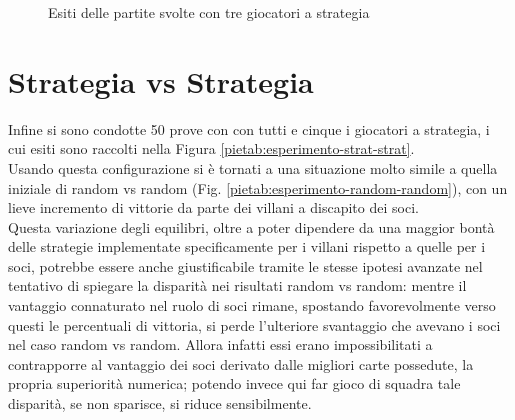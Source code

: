 \begin{figure}[!htb]
\label{piech:ultimo-vill}
\caption{Esiti delle partite svolte con tre giocatori a strategia}
\end{figure}












\section{Strategia vs Strategia}

Infine si sono condotte 50 prove con con tutti e cinque i giocatori a strategia, i cui esiti sono raccolti nella Figura \ref{pietab:esperimento-strat-strat}.\\
Usando questa configurazione si è tornati a una situazione molto simile a quella iniziale di random vs random (Fig. \ref{pietab:esperimento-random-random}), con un lieve incremento di vittorie da parte dei villani a discapito dei soci.\\
Questa variazione degli equilibri, oltre a poter dipendere da una maggior bontà delle strategie implementate specificamente per i villani rispetto a quelle per i soci, potrebbe essere anche giustificabile tramite le stesse ipotesi avanzate nel tentativo di spiegare la disparità nei risultati random vs random: mentre il vantaggio connaturato nel ruolo di soci rimane, spostando favorevolmente verso questi le percentuali di vittoria, si perde l'ulteriore svantaggio che avevano i soci nel caso random vs random.
Allora infatti essi erano impossibilitati a contrapporre al vantaggio dei soci derivato dalle migliori carte possedute, la propria superiorità numerica; potendo invece qui far gioco di squadra tale disparità, se non sparisce, si riduce sensibilmente.


